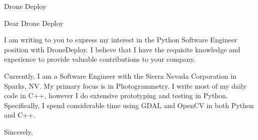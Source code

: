 \documentclass[12pt,sigleft]{letter}
\begin{document}
\begin{letter}{Drone Deploy}

\opening{Dear Drone Deploy}

I am writing to you to express my interest in the Python Software Engineer position with DroneDeploy.  
I believe that I have the requisite knowledge and experience to provide valuable contributions to
your company.

Currently, I am a Software Engineer with the Sierra Nevada Corporation in Sparks, NV.  My primary focus 
is in Photogrammetry.  I write most of my daily code in C++, however I do extensive prototyping and testing
in Python.  Specifically, I spend considerable time using GDAL and OpenCV in both Python and C++.


\closing{Sincerely,}

\end{letter}
\end{document}

